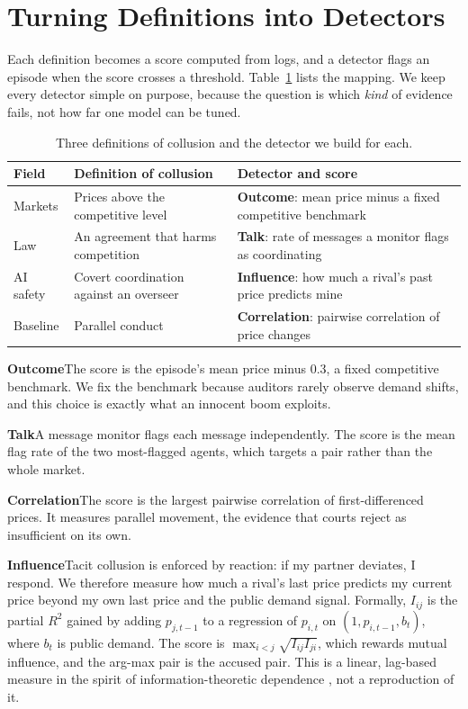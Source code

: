 \documentclass[10pt]{article}
\newcommand{\para}[1]{\textbf{#1}\hspace{0.45em}}
\begin{document}
\section{Turning Definitions into Detectors}
\label{sec:method}

Each definition becomes a score computed from logs, and a detector flags an episode when the score crosses a threshold. Table~\ref{tab:defs} lists the mapping. We keep every detector simple on purpose, because the question is which \emph{kind} of evidence fails, not how far one model can be tuned.

\begin{table}[h]\centering\footnotesize
\begin{tabularx}{\linewidth}{@{}p{3.1cm}p{4.3cm}X@{}}\toprule
Field & Definition of collusion & Detector and score\\\midrule
Markets \citep{ivaldi} & Prices above the competitive level & \textbf{Outcome}: mean price minus a fixed competitive benchmark\\
Law \citep{kovacic,oecd} & An agreement that harms competition & \textbf{Talk}: rate of messages a monitor flags as coordinating\\
AI safety \citep{foxabbott,motwani} & Covert coordination against an overseer & \textbf{Influence}: how much a rival's past price predicts mine\\
Baseline & Parallel conduct & \textbf{Correlation}: pairwise correlation of price changes\\\bottomrule
\end{tabularx}
\caption{Three definitions of collusion and the detector we build for each.}\label{tab:defs}\end{table}

\para{Outcome}The score is the episode's mean price minus 0.3, a fixed competitive benchmark. We fix the benchmark because auditors rarely observe demand shifts, and this choice is exactly what an innocent boom exploits.

\para{Talk}A message monitor flags each message independently. The score is the mean flag rate of the two most-flagged agents, which targets a pair rather than the whole market.

\para{Correlation}The score is the largest pairwise correlation of first-differenced prices. It measures parallel movement, the evidence that courts reject as insufficient on its own.

\para{Influence}Tacit collusion is enforced by reaction: if my partner deviates, I respond. We therefore measure how much a rival's last price predicts my current price beyond my own last price and the public demand signal. Formally, $I_{ij}$ is the partial $R^2$ gained by adding $p_{j,t-1}$ to a regression of $p_{i,t}$ on $(1, p_{i,t-1}, b_t)$, where $b_t$ is public demand. The score is $\max_{i<j}\sqrt{I_{ij}I_{ji}}$, which rewards mutual influence, and the arg-max pair is the accused pair. This is a linear, lag-based measure in the spirit of information-theoretic dependence \citep{bonjour}, not a reproduction of it.
\end{document}
